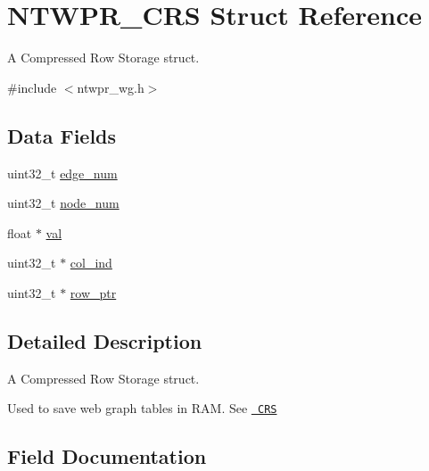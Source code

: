 \hypertarget{structNTWPR__CRS}{}\section{N\+T\+W\+P\+R\+\_\+\+C\+RS Struct Reference}
\label{structNTWPR__CRS}


A Compressed Row Storage struct.  




{\ttfamily \#include $<$ntwpr\+\_\+wg.\+h$>$}

\subsection*{Data Fields}
\begin{DoxyCompactItemize}
\item 
uint32\+\_\+t \mbox{\hyperlink{structNTWPR__CRS_a05685735e3e7157eb84471e95c14e994}{edge\+\_\+num}}
\item 
uint32\+\_\+t \mbox{\hyperlink{structNTWPR__CRS_a745bd86046682b8f2b96974389d4bae2}{node\+\_\+num}}
\item 
float $\ast$ \mbox{\hyperlink{structNTWPR__CRS_a45c38202e915dbfdbbd389166b05df91}{val}}
\item 
uint32\+\_\+t $\ast$ \mbox{\hyperlink{structNTWPR__CRS_a93cf048b735d3757aae9345801ef15fa}{col\+\_\+ind}}
\item 
uint32\+\_\+t $\ast$ \mbox{\hyperlink{structNTWPR__CRS_a33e24ac0e5c91ebc8207447e13c8a636}{row\+\_\+ptr}}
\end{DoxyCompactItemize}


\subsection{Detailed Description}
A Compressed Row Storage struct. 

Used to save web graph tables in R\+AM. See \href{http://netlib.org/linalg/html_templates/node91.html#SECTION00931100000000000000}\texttt{ C\+RS} 

\subsection{Field Documentation}
\mbox{\label{structNTWPR__CRS_a93cf048b735d3757aae9345801ef15fa}} 
